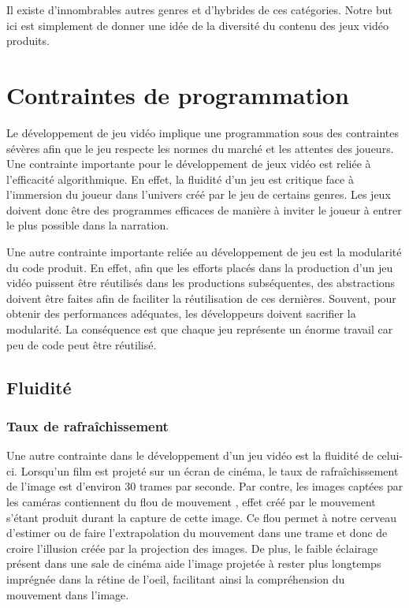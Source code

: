 \documentclass[12pt,twoside,letterpaper,francais]{book}
\begin{document}
Il existe d'innombrables autres genres et d'hybrides de ces
catégories. Notre but ici est simplement de donner une idée de la
diversité du contenu des jeux vidéo produits.


\FloatBarrier
\section{Contraintes de programmation}
Le développement de jeu vidéo implique une programmation sous des
contraintes sévères afin que le jeu respecte les normes du marché et
les attentes des joueurs. Une contrainte importante pour le
développement de jeux vidéo est reliée à l'efficacité
algorithmique. En effet, la fluidité d'un jeu est critique face à
l'immersion du joueur dans l'univers créé par le jeu de certains
genres. Les jeux doivent donc être des programmes efficaces de manière
à inviter le joueur à entrer le plus possible dans la narration.

Une autre contrainte importante reliée au développement de jeu est la
modularité du code produit. En effet, afin que les efforts placés dans
la production d'un jeu vidéo puissent être réutilisés dans les
productions subséquentes, des abstractions doivent être faites afin de
faciliter la réutilisation de ces dernières. Souvent, pour obtenir des
performances adéquates, les développeurs doivent sacrifier la
modularité. La conséquence est que chaque jeu représente un énorme
travail car peu de code peut être réutilisé.


\FloatBarrier
\subsection{Fluidité}
\subsubsection{Taux de rafraîchissement}
Une autre contrainte dans le développement d'un jeu vidéo est la
fluidité de celui-ci. Lorsqu'un film est projeté sur un écran de
cinéma, le taux de rafraîchissement de l'image est d'environ 30 trames
par seconde. Par contre, les images captées par les caméras
contiennent du \og flou de mouvement \fg, effet créé par le mouvement
s'étant produit durant la capture de cette image. Ce flou permet à
notre cerveau d'estimer ou de faire l'extrapolation du mouvement dans
une trame et donc de croire l'illusion créée par la projection des
images. De plus, le faible éclairage présent dans une sale de cinéma
aide l'image projetée à rester plus longtemps imprégnée dans la rétine
de l'oeil, facilitant ainsi la compréhension du mouvement dans
l'image.
\end{document}
